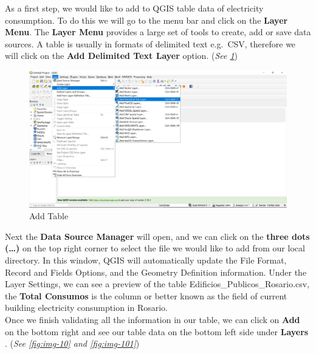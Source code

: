 \documentclass[
]{book}
\begin{document}
As a first step, we would like to add to QGIS table data of electricity consumption. To do this we will go to the menu bar and click on the \textbf{Layer Menu}. The \textbf{Layer Menu} provides a large set of tools to create, add or save data sources. A table is usually in formats of delimited text e.g.~CSV, therefore we will click on the \textbf{Add Delimited Text Layer} option. (\emph{See \ref{fig:img-9}})

\begin{figure}

{\centering \includegraphics[width=1\linewidth]{images/qgis2} 

}

\caption{Add Table}\label{fig:img-9}
\end{figure}

Next the \textbf{Data Source Manager} will open, and we can click on the \textbf{three dots (\ldots)} on the top right corner to select the file we would like to add from our local directory.
In this window, QGIS will automatically update the File Format, Record and Fields Options, and the Geometry Definition information. Under the Layer Settings, we can see a preview of the table {Edificios\_Publicos\_Rosario.csv}, the \textbf{Total Consumos} is the column or better known as the field of current building electricity consumption in Rosario.\\
Once we finish validating all the information in our table, we can click on \textbf{Add} on the bottom right and see our table data on the bottom left side under \textbf{Layers} . (\emph{See \ref{fig:img-10} and \ref{fig:img-101}})
\end{document}
